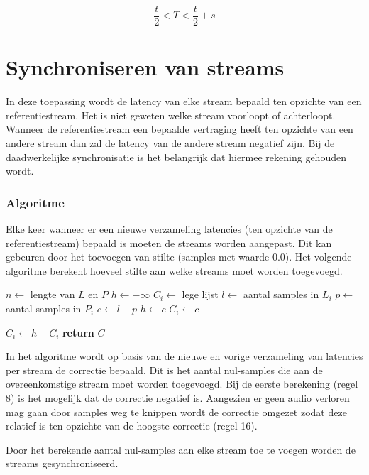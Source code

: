 \begin{equation}
	\frac{t}{2} < T < \frac{t}{2} + s
\end{equation}

\section{Synchroniseren van streams}
\label{corrections}

In deze toepassing wordt de latency van elke stream bepaald ten opzichte van een referentiestream. Het is niet geweten welke stream voorloopt of achterloopt. Wanneer de referentiestream een bepaalde vertraging heeft ten opzichte van een andere stream dan zal de latency van de andere stream negatief zijn. Bij de daadwerkelijke synchronisatie is het belangrijk dat hiermee rekening gehouden wordt.

\subsubsection{Algoritme}

Elke keer wanneer er een nieuwe verzameling latencies (ten opzichte van de referentiestream) bepaald is moeten de streams worden aangepast. Dit kan gebeuren door het toevoegen van stilte (samples met waarde 0.0). Het volgende algoritme berekent hoeveel stilte aan welke streams moet worden toegevoegd.

\begin{algorithm}
	\label{sync-algo}
	\begin{algorithmic}[1] %
		 
		\State $n\gets$ lengte van $L$ en $P$
		\State $h\gets -\infty$ 
		\State $C_i\gets$ lege lijst 
			\State $l\gets$ aantal samples in $L_i$
			\State $p\gets$ aantal samples in $P_i$
			\State $c\gets l - p $ 
				\State $h\gets c$ 
			\EndIf
			\State $C_i\gets c$
		\EndFor
		
			\State $C_i\gets h - C_i$
		\EndFor
		\State \textbf{return} $C$
		\EndFunction
	\end{algorithmic}
\end{algorithm}

In het algoritme wordt op basis van de nieuwe en vorige verzameling van latencies per stream de correctie bepaald. Dit is het aantal nul-samples die aan de overeenkomstige stream moet worden toegevoegd. Bij de eerste berekening (regel 8) is het mogelijk dat de correctie negatief is. Aangezien er geen audio verloren mag gaan door samples weg te knippen wordt de correctie omgezet zodat deze relatief is ten opzichte van de hoogste correctie (regel 16). 

Door het berekende aantal nul-samples aan elke stream toe te voegen worden de streams gesynchroniseerd.